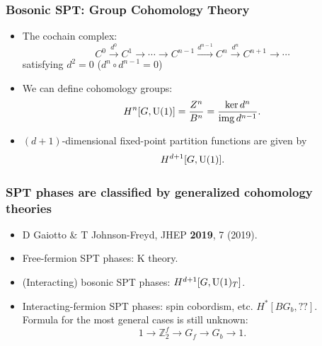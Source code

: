 \documentclass[xcolor=table, aspectratio=169,ignorenonframetext]{beamer}
\DeclareMathOperator{\img}{img}
\newcommand{\uone}{\text U(1)}
\begin{document}
\begin{frame}
	\frametitle{Bosonic SPT: Group Cohomology Theory}
	\begin{itemize}
		\item The cochain complex:
		\[C^0\xrightarrow{d^0}C^1\rightarrow\cdots\rightarrow C^{n-1}\xrightarrow{d^{n-1}}C^n\xrightarrow{d^n}C^{n+1}\rightarrow\cdots\]
		satisfying $d^2=0$ ($d^n\circ d^{n-1}=0$)
		\item We can define cohomology groups:
		\[H^n[G,\uone] = \frac{Z^n}{B^n} = \frac{\ker d^n}{\img d^{n-1}}.\]
		\item $(d+1)$-dimensional fixed-point partition functions are given by
		\[H^{d+1}[G,\uone].\]
	\end{itemize}
\end{frame}

\begin{frame}
	\frametitle{SPT phases are classified by generalized cohomology theories}
	\begin{itemize}
		\item D Gaiotto \& T Johnson-Freyd, JHEP \textbf{2019}, 7 (2019).
		\item Free-fermion SPT phases: K theory.
		\item (Interacting) bosonic SPT phases: $H^{d+1}[G, \uone_T]$.
		\item Interacting-fermion SPT phases: spin cobordism, etc.
                  $H^*[BG_b, ??]$.\\
                  Formula for the most general cases is still unknown:
                  \[1\rightarrow\mathbb Z_2^f\rightarrow G_f\rightarrow G_b\rightarrow1.\]
	\end{itemize}
\end{frame}
\end{document}
